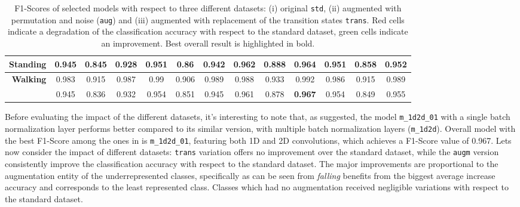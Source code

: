 \begin{table}[!htbp]
{\begin{tabular}{|r|c|c|c|c|c|c|c|c|c|c|c|c|}
\textbf{Standing} & 0.945 & \cellcolor[HTML]{FFCE93}0.845 & \cellcolor[HTML]{FFCE93}0.928 & 0.951 & \cellcolor[HTML]{FFCE93}0.86 & \cellcolor[HTML]{FFCE93}0.942 & 0.962 & \cellcolor[HTML]{FFCE93}0.888 & \cellcolor[HTML]{9AFF99}0.964 & 0.951 & \cellcolor[HTML]{FFCE93}0.858 & \cellcolor[HTML]{9AFF99}0.952 \\ \hline
\textbf{Walking} & 0.983 & \cellcolor[HTML]{FFCE93}0.915 & \cellcolor[HTML]{9AFF99}0.987 & 0.99 & \cellcolor[HTML]{FFCE93}0.906 & \cellcolor[HTML]{FFCE93}0.989 & 0.988 & \cellcolor[HTML]{FFCE93}0.933 & \cellcolor[HTML]{9AFF99}0.992 & 0.986 & \cellcolor[HTML]{FFCE93}0.915 & \cellcolor[HTML]{9AFF99}0.989 \\ \hline
\textbf{} & 0.945 & 0.836 & 0.932 & 0.954 & 0.851 & 0.945 & 0.961 & 0.878 & \textbf{0.967} & 0.954 & 0.849 & 0.955 \\ \hline
\end{tabular}%
}
\caption{F1-Scores of selected models with respect to three different datasets: (i) original \texttt{std}, (ii) augmented with permutation and noise (\texttt{aug}) and (iii) augmented with replacement of the transition states \texttt{trans}. Red cells indicate a degradation of the classification accuracy with respect to the standard dataset, green cells indicate an improvement. Best overall result is highlighted in bold.}
\label{datasets_table}
\end{table}

Before evaluating the impact of the different datasets, it's interesting to note that, as \cite{sensors-2018} suggested, the model \texttt{m_1d2d_01} with a single batch normalization layer performs better compared to its similar version, with multiple batch normalization layers (\texttt{m_1d2d}). Overall model with the best \mbox{F1-Score} among the ones in  is \texttt{m_1d2d_01}, featuring both 1D and 2D convolutions, which achieves a \mbox{F1-Score} value of 0.967. Lets now consider the impact of different datasets: \texttt{trans} variation offers no improvement over the standard dataset, while the \texttt{augm} version consistently improve the classification accuracy with respect to the standard dataset. The major improvements are proportional to the augmentation entity of the underrepresented classes, specifically as can be seen from  {\it falling} benefits from the biggest average increase accuracy and corresponds to the least represented class. Classes which had no augmentation received negligible variations with respect to the standard dataset.

